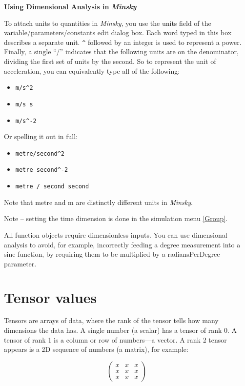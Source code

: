 \textbf{Using Dimensional Analysis in }\textbf{\emph{Minsky}}

To attach units to quantities in \emph{Minsky}, you use the units
field of the variable/parameters/constants edit dialog box. Each word
typed in this box describes a separate unit. \verb+^+
followed by an integer is used to represent a power. Finally, a single
``/'' indicates that the following units are on the denominator,
dividing the first set of units by the second. So to represent the
unit of acceleration, you can equivalently type all of the following:
\begin{itemize}
\item \verb+m/s^2+ 
\item \verb+m/s s+ 
\item \verb+m/s^-2+ 
\end{itemize}
Or spelling it out in full:
\begin{itemize}
\item \verb+metre/second^2+ 
\item \verb+metre second^-2+ 
\item \verb+metre / second second+ 
\end{itemize}
Note that metre and m are distinctly different units in \emph{Minsky}.

Note -- setting the time dimension is done in the simulation menu
\ref{Group}.

All function objects require dimensionless inputs. You can use dimensional
analysis to avoid, for example, incorrectly feeding a degree measurement
into a sine function, by requiring them to be multiplied by a radiansPerDegree
parameter.

\section{Tensor values}

\label{tensors}

Tensors are arrays of data, where the rank of the tensor tells how
many dimensions the data has. A single number (a scalar) has a tensor
of rank 0. A tensor of rank 1 is a column or row of numbers---a vector.
A rank 2 tensor appears is a 2D sequence of numbers (a matrix), for
example:

\[
\left(\begin{array}{ccc}
x & x & x\\
x & x & x\\
x & x & x
\end{array}\right)
\]

